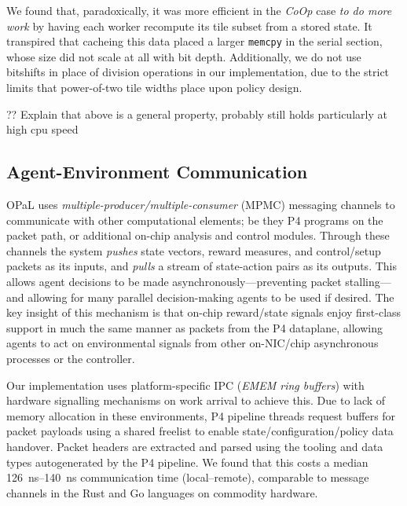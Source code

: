 \documentclass[sigconf,natbib=false]{acmart}
\newcommand{\approachshort}{OPaL}
\newcommand{\Coopfw}{\emph{CoOp}}
\begin{document}
We found that, paradoxically, it was more efficient in the \Coopfw{} case \emph{to do more work} by having each worker recompute its tile subset from a stored state.
It transpired that cacheing this data placed a larger \texttt{memcpy} in the serial section, whose size did not scale at all with bit depth.
Additionally, we do not use bitshifts in place of division operations in our implementation, due to the strict limits that power-of-two tile widths place upon policy design.

?? Explain that above is a general property, probably still holds particularly at high cpu speed

\subsection{Agent-Environment Communication}\label{sec:agent-environment-communication}
\approachshort{} uses \emph{multiple-producer/multiple-consumer} (MPMC) messaging channels to communicate with other computational elements; be they P4 programs on the packet path, or additional on-chip analysis and control modules.
Through these channels the system \emph{pushes} state vectors, reward measures, and control/setup packets as its inputs, and \emph{pulls} a stream of state-action pairs as its outputs.
This allows agent decisions to be made asynchronously---preventing packet stalling---and allowing for many parallel decision-making agents to be used if desired.
The key insight of this mechanism is that on-chip reward/state signals enjoy first-class support in much the same manner as packets from the P4 dataplane, allowing agents to act on environmental signals from other on-NIC/chip asynchronous processes or the controller.

Our implementation uses platform-specific IPC (\emph{EMEM ring buffers}) with hardware signalling mechanisms on work arrival to achieve this.
Due to lack of memory allocation in these environments, P4 pipeline threads request buffers for packet payloads using a shared freelist to enable state/configuration/policy data handover.
Packet headers are extracted and parsed using the tooling and data types autogenerated by the P4 pipeline.
We found that this costs a median \SIrange{126}{140}{\nano\second} communication time (local--remote), comparable to message channels in the Rust and Go languages on commodity hardware.
\end{document}
